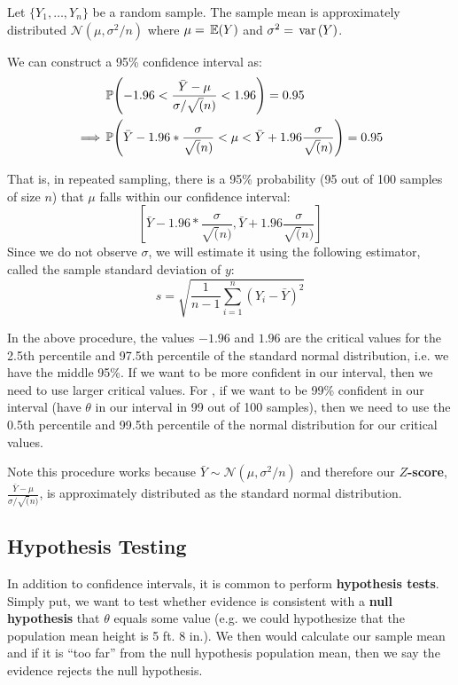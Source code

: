\documentclass[12pt]{article}
\begin{document}
\begin{example}
  Let $\{ Y_1, \dots, Y_n \}$ be a random sample. The sample mean is approximately distributed $\mathcal{N}(\mu, \sigma^2 / n)$ where $\mu = \expec{Y}$ and $\sigma^2 = \var{Y}$. 

  We can construct a 95\% confidence interval as: 
  \begin{align*}
    &\P{-1.96 < \frac{\bar{Y} - \mu}{\sigma / \sqrt(n)} < 1.96} = 0.95 \\
    \implies &\P{\bar{Y} - 1.96 * \frac{\sigma}{\sqrt(n)} < \mu  < \bar{Y} + 1.96 \frac{\sigma}{\sqrt(n)}} = 0.95
  \end{align*}

  That is, in repeated sampling, there is a 95\% probability (95 out of 100 samples of size $n$) that $\mu$ falls within our confidence interval: 
  $$
    \left[
      \bar{Y} - 1.96 * \frac{\sigma}{\sqrt(n)}, 
      \bar{Y} + 1.96 \frac{\sigma}{\sqrt(n)}
    \right]
  $$
  Since we do not observe $\sigma$, we will estimate it using the following estimator, called the sample standard deviation of $y$:
  $$
    s = \sqrt{\frac{1}{n-1} \sum_{i=1}^n (Y_i - \bar{Y})^2}
  $$
\end{example}

In the above procedure, the values $-1.96$ and $1.96$ are the critical values for the 2.5th percentile and 97.5th percentile of the standard normal distribution, i.e. we have the middle 95\%. If we want to be more confident in our interval, then we need to use larger critical values. For , if we want to be 99\% confident in our interval (have $\theta$ in our interval in 99 out of 100 samples), then we need to use the 0.5th percentile and 99.5th percentile of the normal distribution for our critical values.

Note this procedure works because $\bar{Y} \sim \mathcal{N}(\mu, \sigma^2/n)$ and therefore our \textbf{$Z$-score}, $\frac{\bar{Y} - \mu}{\sigma / \sqrt(n)}$, is approximately distributed as the standard normal distribution.


\subsection*{Hypothesis Testing}

In addition to confidence intervals, it is common to perform \textbf{hypothesis tests}. Simply put, we want to test whether evidence is consistent with a \textbf{null hypothesis} that $\theta$ equals some value (e.g. we could hypothesize that the population mean height is 5 ft. 8 in.). We then would calculate our sample mean and if it is ``too far'' from the null hypothesis population mean, then we say the evidence rejects the null hypothesis. 
\end{document}

